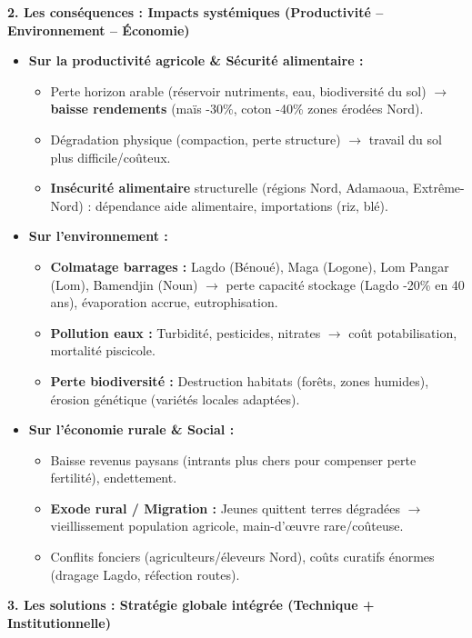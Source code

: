 \documentclass[11pt]{article}
\begin{document}
\begin{corrige}
\medskip
\textbf{2. Les conséquences : Impacts systémiques (Productivité -- Environnement -- Économie)}

\begin{itemize}
    \item \textbf{Sur la productivité agricole \& Sécurité alimentaire :}
    \begin{itemize}
        \item Perte horizon arable (réservoir nutriments, eau, biodiversité du sol) $\rightarrow$ \textbf{baisse rendements} (maïs -30\%, coton -40\% zones érodées Nord).
        \item Dégradation physique (compaction, perte structure) $\rightarrow$ travail du sol plus difficile/coûteux.
        \item \textbf{Insécurité alimentaire} structurelle (régions Nord, Adamaoua, Extrême-Nord) : dépendance aide alimentaire, importations (riz, blé).
    \end{itemize}
    \item \textbf{Sur l'environnement :}
    \begin{itemize}
        \item \textbf{Colmatage barrages :} Lagdo (Bénoué), Maga (Logone), Lom Pangar (Lom), Bamendjin (Noun) $\rightarrow$ perte capacité stockage (Lagdo -20\% en 40 ans), évaporation accrue, eutrophisation.
        \item \textbf{Pollution eaux :} Turbidité, pesticides, nitrates $\rightarrow$ coût potabilisation, mortalité piscicole.
        \item \textbf{Perte biodiversité :} Destruction habitats (forêts, zones humides), érosion génétique (variétés locales adaptées).
    \end{itemize}
    \item \textbf{Sur l'économie rurale \& Social :}
    \begin{itemize}
        \item Baisse revenus paysans (intrants plus chers pour compenser perte fertilité), endettement.
        \item \textbf{Exode rural / Migration :} Jeunes quittent terres dégradées $\rightarrow$ vieillissement population agricole, main-d'œuvre rare/coûteuse.
        \item Conflits fonciers (agriculteurs/éleveurs Nord), coûts curatifs énormes (dragage Lagdo, réfection routes).
    \end{itemize}
\end{itemize}

\medskip
\textbf{3. Les solutions : Stratégie globale intégrée (Technique + Institutionnelle)}


\end{corrige}
\end{document}
